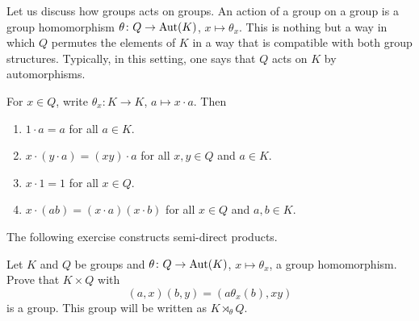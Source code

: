 



Let us discuss how groups acts on groups. An action of a group on a group is 
a group homomorphism 
$\theta\colon Q\to\operatorname{Aut}(K)$, $x\mapsto\theta_x$. 
This is nothing but a way in which $Q$ permutes the elements of $K$ 
in a way that is compatible with both group structures. Typically, in this setting, 
one says that $Q$ acts on $K$ by automorphisms. 

For $x\in Q$, write $\theta_x\colon K\to K$, $a\mapsto x\cdot a$. 
Then 
\begin{enumerate}
    \item $1\cdot a=a$ for all $a\in K$. 
    \item $x\cdot (y\cdot a)=(xy)\cdot a$ for all $x,y\in Q$ and $a\in K$.
    \item $x\cdot 1=1$ for all $x\in Q$. 
    \item $x\cdot (ab)=(x\cdot a)(x\cdot b)$ for all $x\in Q$ and $a,b\in K$. 
\end{enumerate}

The following exercise constructs semi-direct products. 

\begin{exercise}
\label{xca:semi-direct}
Let $K$ and $Q$ be groups and $\theta\colon Q\to\operatorname{Aut}(K)$, $x\mapsto\theta_x$, a group
homomorphism. Prove that $K\times Q$ 
with 
\[
(a,x)(b,y)=(a\theta_x(b),xy)
\]
is a group. This group will be written as $K\rtimes_\theta Q$.
\end{exercise}

